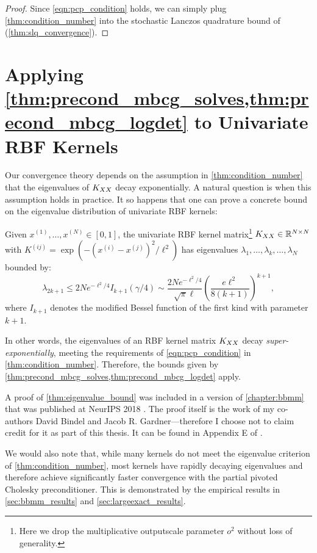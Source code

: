 \begin{proof}
Since \cref{eqn:pcp_condition} holds, we can simply plug \cref{thm:condition_number} into the stochastic Lanczos quadrature bound of \citet{ubaru2017fast} (\cref{thm:slq_convergence}).
\end{proof}









\section{Applying \cref{thm:precond_mbcg_solves,thm:precond_mbcg_logdet} to Univariate RBF Kernels}
\label{app:univariate_rbf}

Our convergence theory depends on the assumption in \cref{thm:condition_number} that the eigenvalues of $K_{XX}$ decay exponentially.
A natural question is when this assumption holds in practice.
It so happens that one can prove a concrete bound on the eigenvalue distribution of univariate RBF kernels:
%
\begin{lemma}
\label{thm:eigenvalue_bound}
Given $x^{(1)}, \ldots, x^{(N)} \in [0, 1]$, the univariate RBF kernel matrix\footnote{
  Here we drop the multiplicative outputscale parameter $o^2$ without loss of generality.
}
$K_{XX} \in \mathbb{R}^{N \times N}$ with $K^{(ij)} = \exp \left(-(x^{(i)} - x^{(j)})^{2} / \ell^2 \right)$ has eigenvalues $\lambda_1, \ldots, \lambda_k, \ldots, \lambda_N$ bounded by:
\begin{equation*}
  \lambda_{2k+1} \leq
  2N e^{-\ell^2/4} I_{k+1}(\gamma/4) \sim
  \frac{2N e^{-\ell^2/4}}{\sqrt{\pi}\ell}
  \left( \frac{e\ell^2}{8(k+1)} \right)^{k+1},
\end{equation*}
where $I_{k+1}$ denotes the modified Bessel function of the first kind with parameter $k + 1$.
\end{lemma}
%
\noindent
In other words, the eigenvalues of an RBF kernel matrix $K_{XX}$ decay \emph{super-exponentially}, meeting the requirements of \cref{eqn:pcp_condition} in \cref{thm:condition_number}.
Therefore, the bounds given by \cref{thm:precond_mbcg_solves,thm:precond_mbcg_logdet} apply.

A proof of \cref{thm:eigenvalue_bound} was included in a version of \cref{chapter:bbmm} that was published at NeurIPS 2018 \citep{gardner2018gpytorch}.
The proof itself is the work of my co-authors David Bindel and Jacob R. Gardner---therefore I choose not to claim credit for it as part of this thesis.
It can be found in Appendix E of \citep{gardner2018gpytorch}.

We would also note that, while many kernels do not meet the eigenvalue criterion of \cref{thm:condition_number}, most kernels have rapidly decaying eigenvalues and therefore achieve significantly faster convergence with the partial pivoted Cholesky preconditioner.
This is demonstrated by the empirical results in \cref{sec:bbmm_results} and \cref{sec:largeexact_results}.
